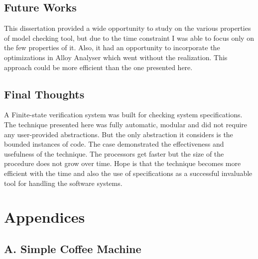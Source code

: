 \documentclass[a4paper,12pt]{report}
\begin{document}
\begin{onehalfspacing}
\section{Future Works}
\label{Future works}
This dissertation provided a wide opportunity to study on the various properties of model checking tool, but due to the time constraint I was able to focus only on the few properties of it. Also, it had an opportunity to incorporate the optimizations in Alloy Analyser which went without the realization. This approach could be more efficient than the one presented here. 

\section{Final Thoughts} 
\label{Final Thoughts} 
A Finite-state verification system was built for checking system specifications. The technique presented here was fully automatic, modular and did not require any user-provided abstractions. But the only abstraction it considers is the bounded instances of code. The case demonstrated the effectiveness and  usefulness of the technique. The processors get faster but the size of the procedure does not grow over time. Hope is that the technique becomes more efficient with the time and also the use of specifications as a successful invaluable tool for handling the software systems. 
\end{onehalfspacing}




\chapter{Appendices}
\label{Appendices}
\section{A. Simple Coffee Machine}
\end{document}
